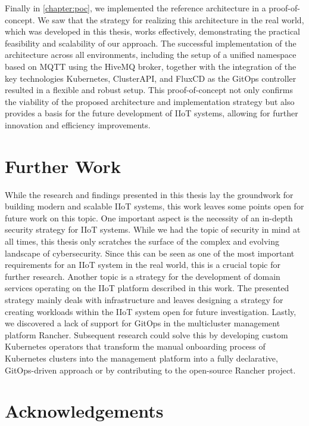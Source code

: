         Finally in \autoref{chapter:poc}, we implemented the reference architecture in a proof-of-concept.  We saw that the strategy for realizing this architecture in the real world, which was developed in this thesis, works effectively, demonstrating the practical feasibility and scalability of our approach. The successful implementation of the architecture across all environments, including the setup of a unified namespace based on MQTT using the HiveMQ broker, together with the integration of the key technologies Kubernetes, ClusterAPI, and FluxCD as the GitOps controller resulted in a flexible and robust setup. This proof-of-concept not only confirms the viability of the proposed architecture and implementation strategy but also provides a basis for the future development of IIoT systems, allowing for further innovation and efficiency improvements. \newline
    

    \section{Further Work}
    \label{section:further-work}

        While the research and findings presented in this thesis lay the groundwork for building modern and scalable IIoT systems, this work leaves some points open for future work on this topic. One important aspect is the necessity of an in-depth security strategy for IIoT systems. While we had the topic of security in mind at all times, this thesis only scratches the surface of the complex and evolving landscape of cybersecurity. Since this can be seen as one of the most important requirements for an IIoT system in the real world, this is a crucial topic for further research. Another topic is a strategy for the development of domain services operating on the IIoT platform described in this work. The presented strategy mainly deals with infrastructure and leaves designing a strategy for creating workloads within the IIoT system open for future investigation. Lastly, we discovered a lack of support for GitOps in the multicluster management platform Rancher. Subsequent research could solve this by developing custom Kubernetes operators that transform the manual onboarding process of Kubernetes clusters into the management platform into a fully declarative, GitOps-driven approach or by contributing to the open-source Rancher project. 
    
    \section{Acknowledgements}

